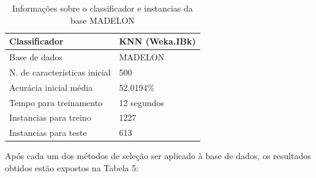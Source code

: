 \begin{table}[H]
\centering
\caption{Informações sobre o classificador e instancias da base MADELON}
\label{my-label}
\begin{tabular}{|l|l|}
\hline
\textbf{Classificador}        & \multicolumn{1}{c|}{\textbf{KNN (Weka.IBk)}} \\ \hline
Base de dados                 & MADELON                               \\ \hline
N. de características inicial & 500                                        \\ \hline
Acurácia inicial média        & 52.0194\%                                   \\ \hline
Tempo para treinamento        & 12 segundos                                  \\ \hline
Instancias para treino        & 1227                                          \\ \hline
Instancias para teste         & 613                                          \\ \hline
\end{tabular}
\end{table}


Após cada um dos métodos de seleção ser aplicado à base de dados, os resultados obtidos estão expostos na Tabela 5:

